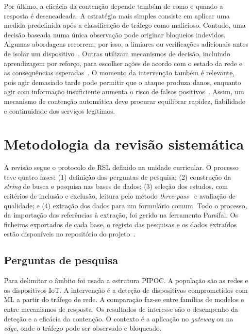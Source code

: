 \documentclass[conference,a4paper]{IEEEtran}
\begin{document}
Por último, a eficácia da contenção depende também de como e quando a resposta é desencadeada. A estratégia mais simples consiste em aplicar uma medida predefinida após a classificação de tráfego como malicioso. Contudo, uma decisão baseada numa única observação pode originar bloqueios indevidos. Algumas abordagens recorrem, por isso, a limiares ou verificações adicionais antes de isolar um dispositivo~\cite{hunde2026rankshield}. Outras utilizam mecanismos de decisão, incluindo aprendizagem por reforço, para escolher ações de acordo com o estado da rede e as consequências esperadas~\cite{zolotukhin2021curious,rose2022ideres}. O momento da intervenção também é relevante, pois agir demasiado tarde pode permitir que o ataque produza danos, enquanto agir com informação insuficiente aumenta o risco de falsos positivos~\cite{tan2023hitting}. Assim, um mecanismo de contenção automática deve procurar equilibrar rapidez, fiabilidade e continuidade dos serviços legítimos.

\section{Metodologia da revisão sistemática}\label{sec:metodologia}
A revisão segue o protocolo de RSL definido na unidade curricular. O processo teve
quatro fases: (1) definição das perguntas de pesquisa; (2) construção da \textit{string}
de busca e pesquisa nas bases de dados; (3) seleção dos estudos, com critérios de
inclusão e exclusão, leitura pelo método \textit{three-pass}~\cite{keshav2007read} e
avaliação de qualidade; e (4) extração dos dados para um formulário comum. Todo o
processo, da importação das referências à extração, foi gerido na ferramenta
Parsifal. Os ficheiros exportados de cada base, o registo das pesquisas
e os dados extraídos estão disponíveis no repositório do projeto~\cite{repo}.

\subsection{Perguntas de pesquisa}
Para delimitar o âmbito foi usada a estrutura PIPOC. A população são as redes e os
dispositivos IoT. A intervenção é a deteção de dispositivos comprometidos com ML a partir
do tráfego de rede. A comparação faz-se entre famílias de modelos e entre mecanismos de
resposta. Os resultados de interesse são o desempenho da deteção e a eficácia da
contenção. O contexto é a aplicação no \textit{gateway} ou na \textit{edge}, onde o
tráfego pode ser observado e bloqueado.
\end{document}
